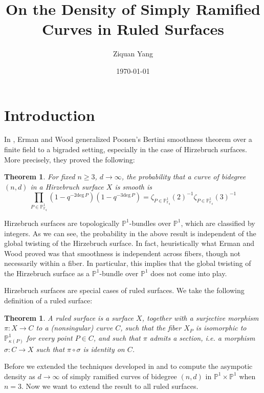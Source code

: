\documentclass[12pt]{article}
\theoremstyle{plain}
\newtheorem{theorem}[equation]{Theorem}
\theoremstyle{definition}
\newcommand{\IF}{\mathbb{F}}
\newcommand{\IP}{\mathbb{P}}
\renewcommand{\deg}{\mathrm{deg}\,}
\newcommand{\<}{\langle}
\renewcommand{\>}{\rangle}
\begin{document}
%

\title{On the Density of Simply Ramified Curves in Ruled Surfaces}
\author{Ziquan Yang}


\date{\today}

\maketitle

 

\setcounter{section}{0}

\section{Introduction}
In \cite{Wood}, Erman and Wood generalized Poonen's Bertini smoothness theorem over a finite field to a bigraded setting, especially in the case of Hirzebruch surfaces. More precisely, they proved the following: 

\begin{theorem}
For fixed $n \ge 3$, $d \to \infty$, the probability that a curve of bidegree $(n, d)$ in a Hirzebruch surface $X$ is smooth is 
$$ \prod_{P \in \IP^1_{\IF_q}} (1 - q^{ - 2 \deg P})(1 - q^{-3 \deg P}) = \zeta_{P \in \IP^1_{\IF_q}}(2)^{-1} \zeta_{P \in \IP^1_{\IF_q}}(3)^{-1} $$
\end{theorem}
Hirzebruch surfaces are topologically $\IP^1$-bundles over $\IP^1$, which are classified by integers. As we can see, the probability in the above result is independent of the global twisting of the Hirzebruch surface. In fact, heuristically what Erman and Wood proved was that smoothness is independent across fibers, though not necessarily within a fiber. In particular, this implies that the global twisting of the Hirzebruch surface as a $\IP^1$-bundle over $\IP^1$ does not come into play.  

Hirzebruch surfaces are special cases of ruled surfaces. We take the following definition of a ruled surface:

\begin{theorem}
\label{main}
A ruled surface is a surface $X$, together with a surjective morphism $\pi : X \to C$ to a (nonsingular) curve $C$, such that the fiber $X_P$ is isomorphic to $\IP^1_{\kappa(P)}$ for every point $P \in C$, and such that $\pi$ admits a section, i.e. a morphism $\sigma : C \to X$ such that $\pi \circ \sigma$ is identity on $C$. 
\end{theorem}

Before we extended the techniques developed in \cite{Poonen} and \cite{Wood} to compute the asympotic density as $d \to \infty$ of simply ramified curves of bidegree $(n, d)$ in $\IP^1 \times \IP^1$ when $n = 3$. Now we want to extend the result to all ruled surfaces. 
\end{document}

